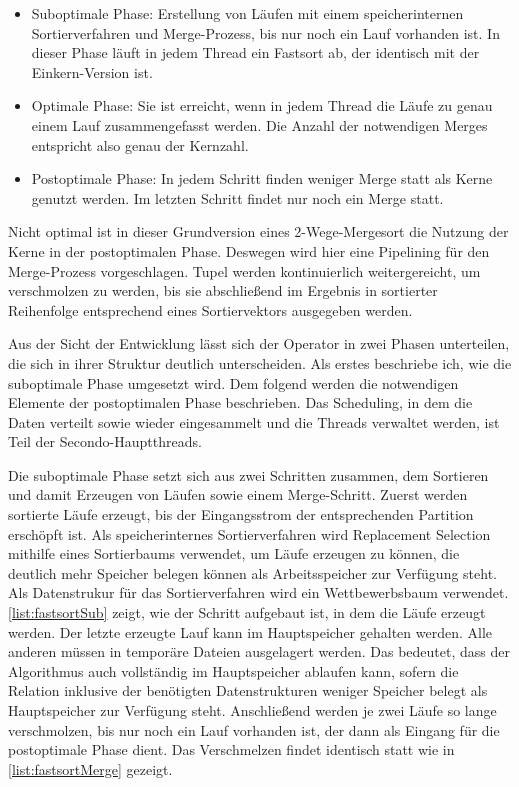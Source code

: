 \documentclass[a4paper,12pt,twoside]{article}
\begin{document}
\begin{itemize}
	\item Suboptimale Phase: Erstellung von Läufen mit einem speicherinternen Sortierverfahren und Merge-Prozess, bis nur noch ein Lauf vorhanden ist. In dieser Phase läuft in jedem Thread ein Fastsort ab, der identisch mit der Einkern-Version ist.
	\item Optimale Phase: Sie ist erreicht, wenn in jedem Thread die Läufe zu genau einem Lauf zusammengefasst werden. Die Anzahl der notwendigen Merges entspricht also genau der Kernzahl. 
	\item Postoptimale Phase: In jedem Schritt finden weniger Merge statt als Kerne genutzt werden. Im letzten Schritt findet nur noch ein Merge statt.
\end{itemize}


Nicht optimal ist in dieser Grundversion eines 2-Wege-Mergesort die Nutzung der Kerne in der postoptimalen Phase. Deswegen wird hier eine Pipelining für den Merge-Prozess vorgeschlagen. Tupel werden kontinuierlich weitergereicht, um verschmolzen zu werden, bis sie abschließend im Ergebnis in sortierter Reihenfolge entsprechend eines Sortiervektors ausgegeben werden. 

Aus der Sicht der Entwicklung lässt sich der Operator in zwei Phasen unterteilen, die sich in ihrer Struktur deutlich unterscheiden. Als erstes beschriebe ich, wie die suboptimale Phase umgesetzt wird. Dem folgend werden die notwendigen Elemente der postoptimalen Phase beschrieben. Das Scheduling, in dem die Daten verteilt sowie wieder eingesammelt und die Threads verwaltet werden, ist Teil der Secondo-Hauptthreads.

Die suboptimale Phase setzt sich aus zwei Schritten zusammen, dem Sortieren und damit Erzeugen von Läufen sowie einem Merge-Schritt. Zuerst werden sortierte Läufe erzeugt, bis der Eingangsstrom der entsprechenden Partition erschöpft ist. Als speicherinternes Sortierverfahren wird Replacement Selection mithilfe eines Sortierbaums verwendet, um Läufe erzeugen zu können, die deutlich mehr Speicher belegen können als Arbeitsspeicher zur Verfügung steht. Als Datenstrukur für das Sortierverfahren wird ein Wettbewerbsbaum verwendet. \autoref{list:fastsortSub} zeigt, wie der Schritt aufgebaut ist, in dem die Läufe erzeugt werden. Der letzte erzeugte Lauf kann im Hauptspeicher gehalten werden. Alle anderen müssen in temporäre Dateien ausgelagert werden. Das bedeutet, dass der Algorithmus auch vollständig im Hauptspeicher ablaufen kann, sofern die Relation inklusive der benötigten Datenstrukturen weniger Speicher belegt als Hauptspeicher zur Verfügung steht. Anschließend werden je zwei Läufe so lange verschmolzen, bis nur noch ein Lauf vorhanden ist, der dann als Eingang für die postoptimale Phase dient. Das Verschmelzen findet identisch statt wie in  \autoref{list:fastsortMerge} gezeigt.
\end{document}
